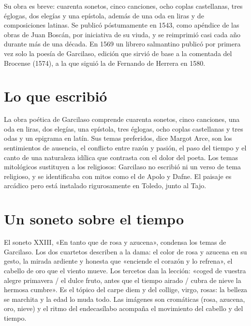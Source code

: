 \documentclass{book}
\begin{document}
Su obra es breve: cuarenta sonetos, cinco canciones, ocho coplas castellanas, tres églogas, dos elegías y una epístola, además de una oda en liras y de composiciones latinas. Se publicó póstumamente en 1543, como apéndice de las obras de Juan Boscán, por iniciativa de su viuda, y se reimprimió casi cada año durante más de una década. En 1569 un librero salmantino publicó por primera vez solo la poesía de Garcilaso, edición que sirvió de base a la comentada del Brocense (1574), a la que siguió la de Fernando de Herrera en 1580.


\section{Lo que escribió}

La obra poética de Garcilaso comprende cuarenta sonetos, cinco canciones, una oda en liras, dos elegías, una epístola, tres églogas, ocho coplas castellanas y tres odas y un epigrama en latín. Sus temas preferidos, dice Margot Arce, son los sentimientos de ausencia, el conflicto entre razón y pasión, el paso del tiempo y el canto de una naturaleza idílica que contrasta con el dolor del poeta. Los temas mitológicos sustituyen a los religiosos: Garcilaso no escribió ni un verso de tema religioso, y se identificaba con mitos como el de Apolo y Dafne. El paisaje es arcádico pero está instalado rigurosamente en Toledo, junto al Tajo.


\section{Un soneto sobre el tiempo}

El soneto XXIII, «En tanto que de rosa y azucena», condensa los temas de Garcilaso. Los dos cuartetos describen a la dama: el color de rosa y azucena en su gesto, la mirada ardiente y honesta que «enciende el corazón y lo refrena», el cabello de oro que el viento mueve. Los tercetos dan la lección: «coged de vuestra alegre primavera / el dulce fruto, antes que el tiempo airado / cubra de nieve la hermosa cumbre». Es el tópico del carpe diem y del collige, virgo, rosas: la belleza se marchita y la edad lo muda todo. Las imágenes son cromáticas (rosa, azucena, oro, nieve) y el ritmo del endecasílabo acompaña el movimiento del cabello y del tiempo.
\end{document}
